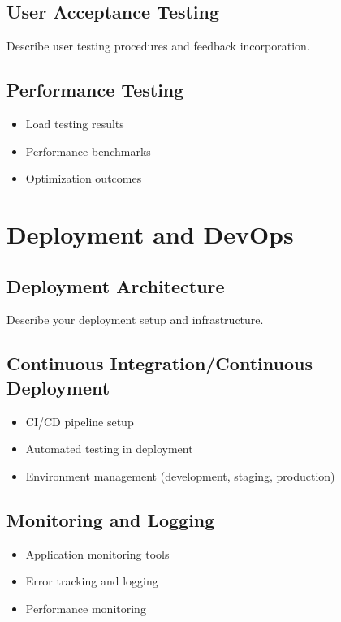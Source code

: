 \documentclass[12pt,a4paper]{article}
\begin{document}
\subsection{User Acceptance Testing}
Describe user testing procedures and feedback incorporation.

\subsection{Performance Testing}
\begin{itemize}
    \item Load testing results
    \item Performance benchmarks
    \item Optimization outcomes
\end{itemize}

\section{Deployment and DevOps}
\label{sec:deployment}

\subsection{Deployment Architecture}
Describe your deployment setup and infrastructure.

\subsection{Continuous Integration/Continuous Deployment}
\begin{itemize}
    \item CI/CD pipeline setup
    \item Automated testing in deployment
    \item Environment management (development, staging, production)
\end{itemize}

\subsection{Monitoring and Logging}
\begin{itemize}
    \item Application monitoring tools
    \item Error tracking and logging
    \item Performance monitoring
\end{itemize}
\end{document}
